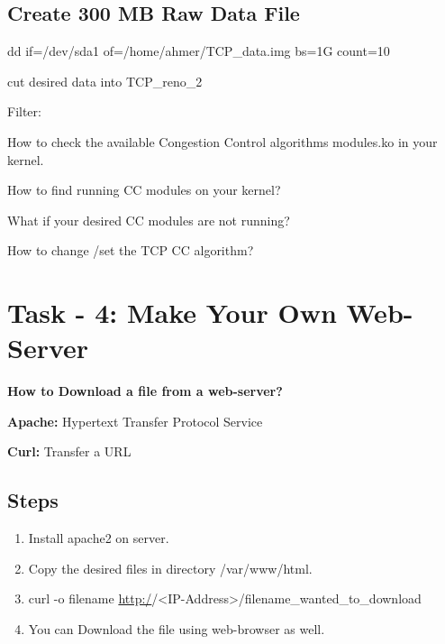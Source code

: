 \documentclass[letterpaper,10pt,english]{sphinxmanual}
\begin{document}
\subsection{Create 300 MB Raw Data File}
\label{week-07:create-300-mb-raw-data-file}
dd if=/dev/sda1 of=/home/ahmer/TCP\_data.img bs=1G count=10


cut desired data into TCP\_reno\_2

Filter: 

How to check the available Congestion Control algorithms modules.ko in your kernel.


How to find running CC modules on your kernel?



What if your desired CC modules are not running?


How to change /set the TCP CC algorithm?



\section{Task - 4: Make Your Own Web-Server}
\label{week-07:task-4-make-your-own-web-server}
\textbf{How to Download a file from a web-server?}

\textbf{Apache:}     Hypertext Transfer Protocol Service

\textbf{Curl:}               Transfer a URL


\subsection{Steps}
\label{week-07:steps}\begin{enumerate}
\item {} 
Install apache2 on server.

\item {} 
Copy the desired files in directory /var/www/html.

\item {} 
curl -o filename \href{http:/}{http:/}/\textless{}IP-Address\textgreater{}/filename\_wanted\_to\_download

\item {} 
You can Download the file using web-browser as well.

\end{enumerate}
\end{document}
